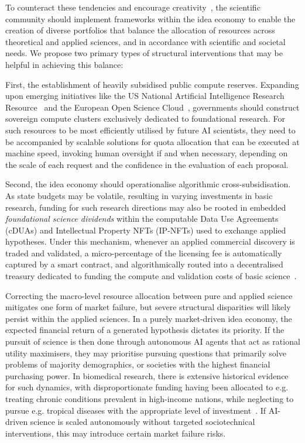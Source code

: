 \documentclass[11pt, a4paper, twocolumn, goog]{google}
\begin{document}
To counteract these tendencies and encourage creativity~\citep{azoulay2011incentives}, the scientific community should implement frameworks within the idea economy to enable the creation of diverse portfolios that balance the allocation of resources across theoretical and applied sciences, and in accordance with scientific and societal needs. We propose two primary types of structural interventions that may be helpful in achieving this balance:

First, the establishment of heavily subsidised public compute reserves. Expanding upon emerging initiatives like the US National Artificial Intelligence Research Resource~\citep{parashar2023strengthening} and the European Open Science Cloud~\citep{ayris2016realising, mons2017cloudy}, governments should construct sovereign compute clusters exclusively dedicated to foundational research. For such resources to be most efficiently utilised by future AI scientists, they need to be accompanied by scalable solutions for quota allocation that can be executed at machine speed, invoking human oversight if and when necessary, depending on the scale of each request and the confidence in the evaluation of each proposal.

Second, the idea economy should operationalise algorithmic cross-subsidisation. As state budgets may be volatile, resulting in varying investments in basic research, funding for such research directions may also be rooted in embedded \emph{foundational science dividends} within the computable Data Use Agreements (cDUAs) and Intellectual Property NFTs (IP-NFTs) used to exchange applied hypotheses. Under this mechanism, whenever an applied commercial discovery is traded and validated, a micro-percentage of the licensing fee is automatically captured by a smart contract, and algorithmically routed into a decentralised treasury dedicated to funding the compute and validation costs of basic science~\citep{posner2018radical}.

Correcting the macro-level resource allocation between pure and applied science mitigates one form of market failure, but severe structural disparities will likely persist within the applied sciences. In a purely market-driven idea economy, the expected financial return of a generated hypothesis dictates its priority. If the pursuit of science is then done through autonomous AI agents that act as rational utility maximisers, they may prioritise pursuing questions that primarily solve problems of majority demographics, or societies with the highest financial purchasing power. In biomedical research, there is extensive historical evidence for such dynamics, with disproportionate funding having been allocated to e.g. treating chronic conditions prevalent in high-income nations, while neglecting to pursue e.g. tropical diseases with the appropriate level of investment~\citep{trouiller2002drug, conteh2010socioeconomic, feasey2010neglected, world2010working, world2015investing, mitra2017neglected, gyapong2025current}. If AI-driven science is scaled autonomously without targeted sociotechnical interventions, this may introduce certain market failure risks.
\end{document}
